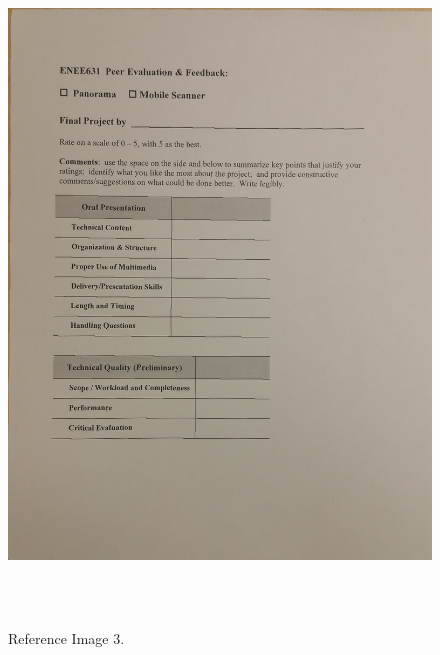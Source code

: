 \begin{figure}[th]
	\centering
	\includegraphics[height=18cm ]{Figures/test_warped_reference_image}
	\caption[Reference Image 3]{Reference Image 3.}
	\label{fig:ReferenceImage3}
\end{figure}
\pagebreak
